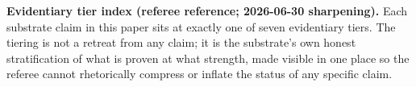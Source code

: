 \documentclass[11pt,a4paper]{amsart}
\theoremstyle{plain}
\theoremstyle{definition}
\begin{document}
\maketitle

\vspace*{-1em}

\par\medskip\noindent\textbf{Evidentiary tier index (referee reference; 2026-06-30 sharpening).} Each substrate claim in this paper sits at exactly one of seven evidentiary tiers. The tiering is not a retreat from any claim; it is the substrate's own honest stratification of what is proven at what strength, made visible in one place so the referee cannot rhetorically compress or inflate the status of any specific claim.

\vspace{0.5em}
\end{document}
